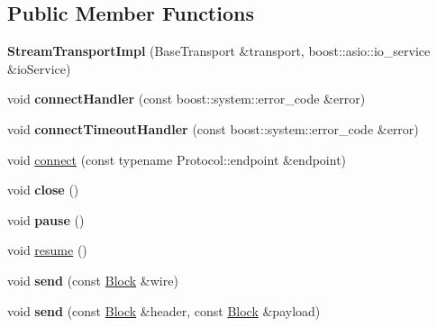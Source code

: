 \subsection*{Public Member Functions}
\begin{DoxyCompactItemize}
\item 
{\bfseries Stream\+Transport\+Impl} (Base\+Transport \&transport, boost\+::asio\+::io\+\_\+service \&io\+Service)\hypertarget{classndn_1_1StreamTransportImpl_ae29a210b327deef1c52bde95d1d3b35d}{}\label{classndn_1_1StreamTransportImpl_ae29a210b327deef1c52bde95d1d3b35d}

\item 
void {\bfseries connect\+Handler} (const boost\+::system\+::error\+\_\+code \&error)\hypertarget{classndn_1_1StreamTransportImpl_af03dc0e8267d1f937fe570e64148117f}{}\label{classndn_1_1StreamTransportImpl_af03dc0e8267d1f937fe570e64148117f}

\item 
void {\bfseries connect\+Timeout\+Handler} (const boost\+::system\+::error\+\_\+code \&error)\hypertarget{classndn_1_1StreamTransportImpl_ad8d4c2a31366712fb74e22663d0c906d}{}\label{classndn_1_1StreamTransportImpl_ad8d4c2a31366712fb74e22663d0c906d}

\item 
void \hyperlink{classndn_1_1StreamTransportImpl_a18f5d3a18d375d9cb9ce075e5f10aef8}{connect} (const typename Protocol\+::endpoint \&endpoint)
\item 
void {\bfseries close} ()\hypertarget{classndn_1_1StreamTransportImpl_ae89e2ecd27402a1c9bebd3b1c99c7067}{}\label{classndn_1_1StreamTransportImpl_ae89e2ecd27402a1c9bebd3b1c99c7067}

\item 
void {\bfseries pause} ()\hypertarget{classndn_1_1StreamTransportImpl_a16a0693baa8833d444ff8fc5e0f53034}{}\label{classndn_1_1StreamTransportImpl_a16a0693baa8833d444ff8fc5e0f53034}

\item 
void \hyperlink{classndn_1_1StreamTransportImpl_a655262fb39e654898f610dfe57bb8091}{resume} ()
\item 
void {\bfseries send} (const \hyperlink{classndn_1_1Block}{Block} \&wire)\hypertarget{classndn_1_1StreamTransportImpl_a3118594ff0bf31acc5bc83f2c8161cec}{}\label{classndn_1_1StreamTransportImpl_a3118594ff0bf31acc5bc83f2c8161cec}

\item 
void {\bfseries send} (const \hyperlink{classndn_1_1Block}{Block} \&header, const \hyperlink{classndn_1_1Block}{Block} \&payload)\hypertarget{classndn_1_1StreamTransportImpl_af8dad3c46a8e6d3670630252e9824207}{}\label{classndn_1_1StreamTransportImpl_af8dad3c46a8e6d3670630252e9824207}


\end{DoxyCompactItemize}
